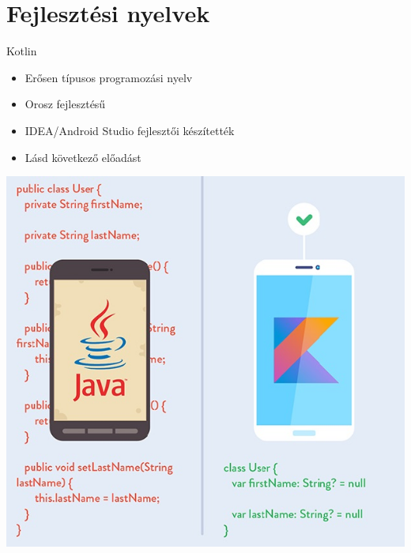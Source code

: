 \documentclass{beamer}
\begin{document}
\section{Fejlesztési nyelvek}
\begin{frame}[fragile]{Kotlin}
	\begin{minipage}{0.45\textwidth}
		\begin{itemize}
			\item Erősen típusos programozási nyelv
			\item Orosz fejlesztésű
			\item IDEA/Android Studio fejlesztői készítették
			\item Lásd következő előadást
		\end{itemize}
	\end{minipage}
	\begin{minipage}{0.49\textwidth}
		\includegraphics[width=1\linewidth]{figures/Kotlin-Vs-Java.jpg}
	\end{minipage}
\end{frame}
\end{document}
